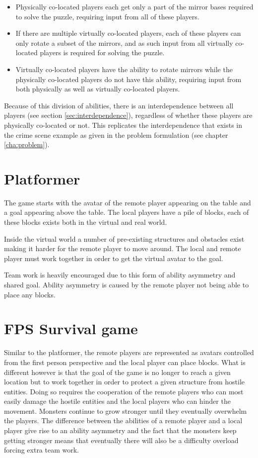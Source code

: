 	\begin{itemize}
		\item Physically co-located players each get only a part of the
		      mirror bases required to solve the puzzle, requiring input
		      from all of these players.
		\item If there are multiple virtually co-located players, each of
		      these players can only rotate a subset of the mirrors, and
		      as such input from all virtually co-located players is
		      required for solving the puzzle.
		\item Virtually co-located players have the ability to rotate
		      mirrors while the physically co-located players do not have
		      this ability, requiring input from both physically as well
		      as virtually co-located players.
	\end{itemize}

	Because of this division of abilities, there is an interdependence
	between all players (see section \ref{sec:interdependence}), regardless of
	whether these players are physically co-located or not. This replicates the
	interdependence that exists in the crime scene example as given in the
	problem formulation (see chapter \ref{cha:problem}).

\section{Platformer}
	The game starts with the avatar of the remote player appearing
	on the table and a goal appearing above the table. The local
  players have a pile of blocks, each of these blocks exists both
  in the virtual and real world.

	Inside the virtual world a number of pre-existing structures and
	obstacles exist making it harder for the remote player to move around.
	The local and remote player must work together in order to get the
	virtual avatar to the goal.

	Team work is heavily encouraged due to this form of ability
	asymmetry and shared goal. Ability asymmetry is caused by the remote
	player not being able to place any blocks.

\section{FPS Survival game}
	Similar to the platformer, the remote players are represented
	as avatars controlled from the first person perspective and
	the local player can place blocks. What is different however
	is that the goal of the game is no longer to reach a given
	location but to work together in order to protect a given
	structure from hostile entities. Doing so requires the
	cooperation of the remote players who can most easily damage
	the hostile entities and the local players who can hinder the
	movement. Monsters continue to grow stronger until they eventually
	overwhelm the players.
	The difference between the abilities of a remote player and
	a local player give rise to an ability asymmetry and the fact
	that the monsters keep getting stronger means that eventually
	there will also be a difficulty overload forcing extra
	team work.

